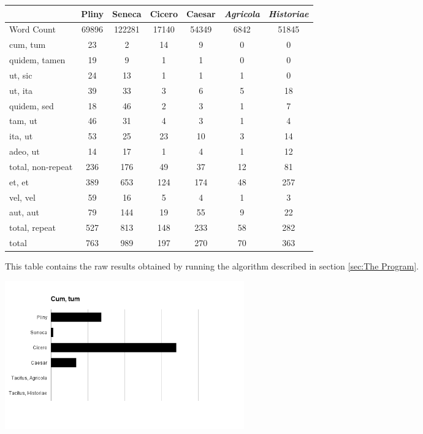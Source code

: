 \begin{figure}[t]
  \begin{center}
    \begin{tabular}{| l || c | c | c | c | c | c |}
      \hline
      & Pliny & Seneca & Cicero & Caesar & \textit{Agricola} & \textit{Historiae}  \\ \hline \hline
      Word Count & 69896 & 122281 & 17140 & 54349 & 6842 & 51845 \\ \hline \hline
      cum, tum & 23 & 2 & 14 & 9 & 0 & 0 \\ \hline
      quidem, tamen & 19 & 9 & 1 & 1 & 0 & 0 \\ \hline
      ut, sic & 24 & 13 & 1 & 1 & 1 & 0 \\ \hline
      ut, ita & 39 & 33 & 3 & 6 & 5 & 18 \\ \hline
      quidem, sed & 18 & 46 & 2 & 3 & 1 & 7 \\ \hline
      tam, ut & 46 & 31 & 4 & 3 & 1 & 4 \\ \hline
      ita, ut & 53 & 25 & 23 & 10 & 3 & 14 \\ \hline
      adeo, ut & 14 & 17 & 1 & 4 & 1 & 12 \\ \hline \hline
      total, non-repeat & 236 & 176 & 49 & 37 & 12 & 81 \\ \hline \hline
      et, et & 389 & 653 & 124 & 174 & 48 & 257 \\ \hline
      vel, vel & 59 & 16 & 5 & 4 & 1 & 3 \\ \hline
      aut, aut & 79 & 144 & 19 & 55 & 9 & 22 \\ \hline \hline
      total, repeat & 527 & 813 & 148 & 233 & 58 & 282 \\ \hline \hline
      total & 763 & 989 & 197 & 270 & 70 & 363 \\
      \hline
    \end{tabular}
  \end{center}
  \caption{\label{fig:results}This table contains the raw results obtained by running the algorithm described in section \ref{sec:The Program}.}
\end{figure}

\begin{figure}
\includegraphics[width=0.5\textwidth]{cumtum.png}
\end{figure}

